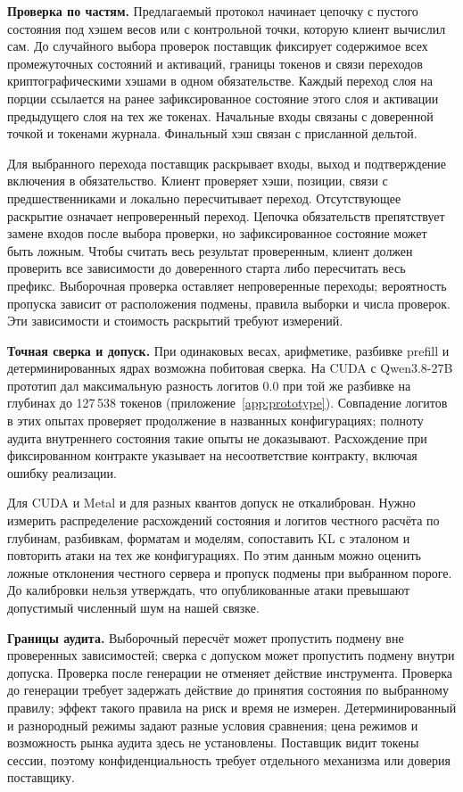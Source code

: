 \textbf{Проверка по частям.} Предлагаемый протокол начинает цепочку с пустого состояния под хэшем весов
или с контрольной точки, которую клиент вычислил сам. До случайного выбора проверок поставщик фиксирует
содержимое всех промежуточных состояний и активаций, границы токенов и связи переходов криптографическими
хэшами в одном обязательстве. Каждый переход слоя на порции ссылается на ранее зафиксированное состояние
этого слоя и активации предыдущего слоя на тех же токенах. Начальные входы связаны с доверенной точкой
и токенами журнала. Финальный хэш связан с присланной дельтой.

Для выбранного перехода поставщик раскрывает входы, выход и подтверждение включения в обязательство.
Клиент проверяет хэши, позиции, связи с предшественниками и локально пересчитывает переход. Отсутствующее
раскрытие означает непроверенный переход. Цепочка обязательств препятствует замене входов после выбора
проверки, но зафиксированное состояние может быть ложным. Чтобы считать весь результат проверенным,
клиент должен проверить все зависимости до доверенного старта либо пересчитать весь префикс.
Выборочная проверка оставляет непроверенные переходы; вероятность пропуска зависит от расположения подмены,
правила выборки и числа проверок. Эти зависимости и стоимость раскрытий требуют измерений.

\textbf{Точная сверка и допуск.} При одинаковых весах, арифметике, разбивке prefill и детерминированных ядрах
возможна побитовая сверка. На CUDA с Qwen3.8-27B прототип дал максимальную разность логитов 0.0 при той же
разбивке на глубинах до 127\,538 токенов (приложение~\ref{app:prototype}). Совпадение логитов в этих опытах
проверяет продолжение в названных конфигурациях; полноту аудита внутреннего состояния такие опыты не доказывают.
Расхождение при фиксированном контракте указывает на несоответствие контракту, включая ошибку реализации.

Для CUDA и Metal и для разных квантов допуск не откалиброван. Нужно измерить распределение расхождений
состояния и логитов честного расчёта по глубинам, разбивкам, форматам и моделям, сопоставить KL с эталоном
и повторить атаки на тех же конфигурациях. По этим данным можно оценить ложные отклонения честного сервера
и пропуск подмены при выбранном пороге. До калибровки нельзя утверждать, что опубликованные атаки
превышают допустимый численный шум на нашей связке.

\textbf{Границы аудита.} Выборочный пересчёт может пропустить подмену вне проверенных зависимостей;
сверка с допуском может пропустить подмену внутри допуска. Проверка после генерации не отменяет действие
инструмента. Проверка до генерации требует задержать действие до принятия состояния по выбранному правилу;
эффект такого правила на риск и время не измерен. Детерминированный и разнородный режимы задают разные
условия сравнения; цена режимов и возможность рынка аудита здесь не установлены.
Поставщик видит токены сессии, поэтому конфиденциальность требует отдельного механизма или доверия поставщику.
